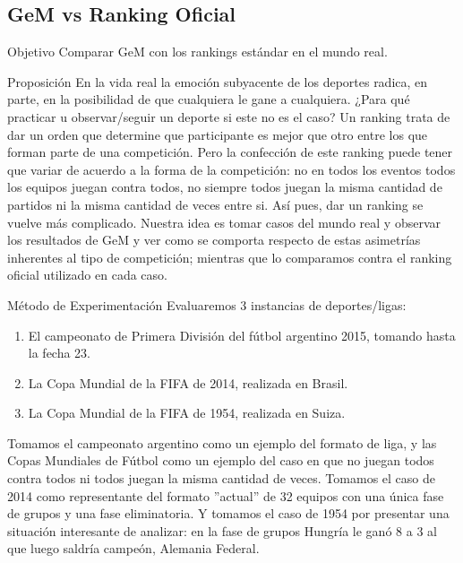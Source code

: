 \subsection{GeM vs Ranking Oficial}
\label{subsec:exp6}
\begin{LaTeXdescription}
    \item[Objetivo] Comparar GeM con los rankings estándar en el mundo real.\\

    \item[Proposici\'on] En la vida real la emoción subyacente de los deportes
        radica, en parte, en la posibilidad de que cualquiera le gane a
        cualquiera. ¿Para qué practicar u observar/seguir un deporte si este no
        es el caso?  Un ranking trata de dar un orden que determine que
        participante es mejor que otro entre los que forman parte de una
        competición. Pero la confección de este ranking puede tener que variar
        de acuerdo a la forma de la competición: no en todos los eventos todos
        los equipos juegan contra todos, no siempre todos juegan la misma
        cantidad de partidos ni la misma cantidad de veces entre si. Así pues,
        dar un ranking se vuelve más complicado. Nuestra idea es tomar casos del
        mundo real y observar los resultados de GeM y ver como se comporta
        respecto de estas asimetrías inherentes al tipo de competición; mientras
        que lo comparamos contra el ranking oficial utilizado en cada caso.\\

    \item[M\'etodo de Experimentaci\'on] Evaluaremos 3 instancias de
        deportes/ligas:

        \begin{enumerate}
            \item El campeonato de Primera División del fútbol argentino 2015,
                tomando hasta la fecha 23.

            \item La Copa Mundial de la FIFA de 2014, realizada en Brasil.

            \item La Copa Mundial de la FIFA de 1954, realizada en Suiza.
        \end{enumerate}
        \medskip

        \par Tomamos el campeonato argentino como un ejemplo del formato de
        liga, y las Copas Mundiales de Fútbol como un ejemplo del caso en que no
        juegan todos contra todos ni todos juegan la misma cantidad de veces.
        Tomamos el caso de 2014 como representante del formato ''actual'' de 32
        equipos con una única fase de grupos y una fase eliminatoria. Y tomamos
        el caso de 1954 por presentar una situación interesante de analizar: en
        la fase de grupos Hungría le ganó 8 a 3 al que luego saldría campeón,
        Alemania Federal.


\end{LaTeXdescription}
